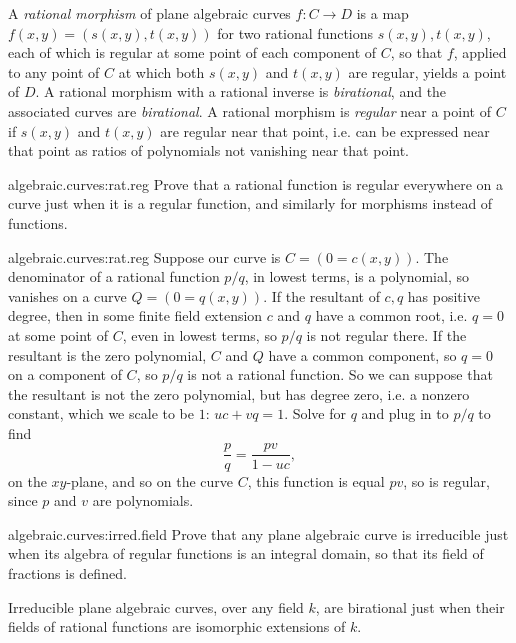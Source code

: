 A \emph{rational morphism} of plane algebraic curves \(f \colon C \to D\) is a map \(f(x,y)=(s(x,y),t(x,y))\) for two rational functions \(s(x,y), t(x,y)\), each of which is regular at some point of each component of \(C\), so that \(f\), applied to any point of \(C\) at which both \(s(x,y)\) and \(t(x,y)\) are regular, yields a point of \(D\).
A rational morphism with a rational inverse is \emph{birational}, and the associated curves are \emph{birational}.
A rational morphism is \emph{regular} near a point of \(C\) if \(s(x,y)\) and \(t(x,y)\) are regular near that point, i.e. can be expressed near that point as ratios of polynomials not vanishing near that point.
\begin{problem}{algebraic.curves:rat.reg}
Prove that a rational function is regular everywhere on a curve just when it is a regular function, and similarly for morphisms instead of functions.
\end{problem}
\begin{answer}{algebraic.curves:rat.reg}
Suppose our curve is \(C=(0=c(x,y))\).
The denominator of a rational function \(p/q\), in lowest terms, is a polynomial, so vanishes on a curve \(Q=(0=q(x,y))\).
If the resultant of \(c,q\) has positive degree, then in some finite field extension \(c\) and \(q\) have a common root, i.e. \(q=0\) at some point of \(C\), even in lowest terms, so \(p/q\) is not regular there.
If the resultant is the zero polynomial, \(C\) and \(Q\) have a common component, so \(q=0\) on a component of \(C\), so \(p/q\) is not a rational function.
So we can suppose that the resultant is not the zero polynomial, but has degree zero, i.e. a nonzero constant, which we scale to be \(1\): \(uc+vq=1\).
Solve for \(q\) and plug in to \(p/q\) to find
\[
\frac{p}{q}=\frac{pv}{1-uc},
\]
on the \(xy\)-plane, and so on the curve \(C\), this function is equal \(pv\), so is regular, since \(p\) and \(v\) are polynomials.
\end{answer}
\begin{problem}{algebraic.curves:irred.field}
Prove that any plane algebraic curve is irreducible just when its algebra of regular functions is an integral domain, so that its field of fractions is defined.
\end{problem}
\begin{lemma}
Irreducible plane algebraic curves, over any field \(k\), are birational just when their fields of rational functions are isomorphic extensions of \(k\).
\end{lemma}
